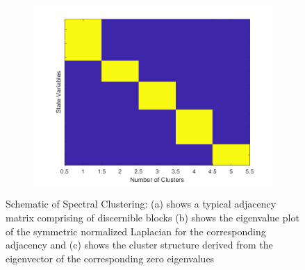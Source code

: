 \begin{figure}[H]
\begin{subfigure}{0.32\textwidth}
\caption{}
\label{fig:sc_eigen}
\end{subfigure}
\begin{subfigure}{0.32\textwidth}
\centering
\includegraphics[width=\textwidth]{figures/cluster}
\caption{}
\label{fig:sc_cluster}
\end{subfigure}
\caption{Schematic of Spectral Clustering: (a) shows a typical adjacency matrix comprising of discernible blocks (b) shows the eigenvalue plot of the symmetric normalized Laplacian for the corresponding adjacency and (c) shows the cluster structure derived from the eigenvector of the corresponding zero eigenvalues}
\label{fig:spectral}
\end{figure}



